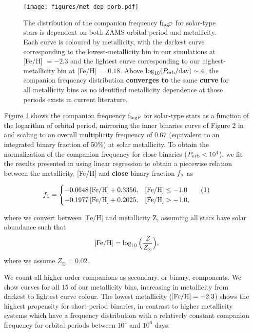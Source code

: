 \documentclass[twocolumn]{aastex631}
\newcommand\numberthis{\addtocounter{equation}{1}\tag{\theequation}}
\begin{document}
\begin{figure}
	\texttt{[image: figures/met\_dep\_porb.pdf]}
    \caption{The distribution of the companion frequency f$_{\rm{logP}}$ for solar-type stars is dependent on both ZAMS orbital period and metallicity. Each curve is coloured by metallicity, with the darkest curve corresponding to the lowest-metallicity bin in our simulations at [Fe/H] $=-2.3$ and the lightest curve corresponding to our highest-metallicity bin at [Fe/H] $=0.18$. Above $\log_{10}(P_{\rm{orb}}/\rm{day})\sim 4$, the companion frequency distribution \textbf{converges to} the same \textbf{curve} for all metallicity bins as no identified metallicity dependence at those periods exists in current literature.}
    \label{fig:met_dep_porb}
\end{figure}

Figure \ref{fig:met_dep_porb} shows the companion frequency f$_{\rm{logP}}$ for solar-type stars as a function of the logarithm of orbital period, mirroring the inner binaries curve of Figure 2 in \citet{Moe2021} and scaling to an overall multiplicity frequency of 0.67 (equivalent to an integrated binary fraction of 50\%) at solar metallicity. To obtain the normalization of the companion frequency for close binaries ($P_{\rm{orb}}<10^4$), we fit the results presented in \citet{Moe2019} using linear regression to obtain a piecewise relation between the metallicity, [Fe/H] and \textbf{close} binary fraction $f_{\rm{b}}$ as

\[f_{\rm{b}}= \begin{cases} 
      - 0.0648 \, \rm{ [Fe/H]} + 0.3356, & [\rm{Fe/H}]\leq -1.0 \numberthis \\
     -0.1977 \, \rm{ [Fe/H]} + 0.2025, & [\rm{Fe/H}]> -1.0  , 
   \end{cases}
\]

\noindent where we convert between [Fe/H] and metallicity Z, assuming all stars have solar abundance such that
\begin{equation}
\label{eq:metallicity}
    [\rm{Fe/H}] = \log_{10}\Big(\frac{\textit{Z}}{\textit{Z}_{\odot}}\Big),
\end{equation}
\noindent where we assume $Z_{\odot}=0.02$.

We count all higher-order companions as secondary, or binary, components. We show curves for all 15 of our metallicity bins, increasing in metallicity from darkest to lightest curve colour. The lowest metallicity ($\rm{[Fe/H]}=-2.3$) shows the highest propensity for short-period binaries, in contrast to higher metallicity systems which have a frequency distribution with a relatively constant companion frequency for orbital periods between $10^4$ and $10^6$ days.
\end{document}
